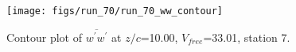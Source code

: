 \begin{figure}[H]
\centering
\texttt{[image: figs/run\_70/run\_70\_ww\_contour]}
\caption{Contour plot of $\overline{w^\prime w^\prime}$ at $z/c$=10.00, $V_{free}$=33.01, station 7.}
\label{fig:run_70_ww_contour}
\end{figure}


